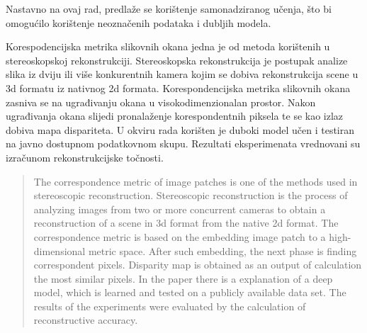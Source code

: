 \documentclass[times, utf8, zavrsni, numeric]{fer}
\begin{document}
Nastavno na ovaj rad, predlaže se korištenje samonadziranog učenja, što bi omogućilo korištenje neoznačenih podataka i dubljih modela.




\begin{sazetak}
Korespodencijska metrika slikovnih okana jedna je od metoda korištenih u \\stereoskopskoj rekonstrukciji. Stereoskopska rekonstrukcija je postupak analize slika iz dviju ili više konkurentnih kamera kojim se dobiva rekonstrukcija scene u 3d formatu iz nativnog 2d formata. Korespondencijska metrika slikovnih okana zasniva se na ugrađivanju okana u visokodimenzionalan prostor. Nakon ugrađivanja okana slijedi pronalaženje korespondentnih piksela te se kao izlaz dobiva mapa dispariteta. U okviru rada korišten je duboki model učen i testiran na javno dostupnom podatkovnom skupu. Rezultati eksperimenata vrednovani su izračunom rekonstrukcijske točnosti.

\end{sazetak}

\begin{abstract}
The correspondence metric of image patches is one of the methods used in stereoscopic reconstruction. Stereoscopic reconstruction is the process of analyzing images from two or more concurrent cameras to obtain a reconstruction of a scene in 3d format from the native 2d format. The correspondence metric is based on the embedding
image patch to a high-dimensional metric space. After such embedding, the next phase is finding correspondent pixels. Disparity map is obtained as an output of calculation the most similar pixels.  In the paper there is a explanation of a deep model, which is learned and tested on a publicly available data set. The results of the experiments were evaluated by the calculation of reconstructive accuracy.

\end{abstract}
\end{document}
